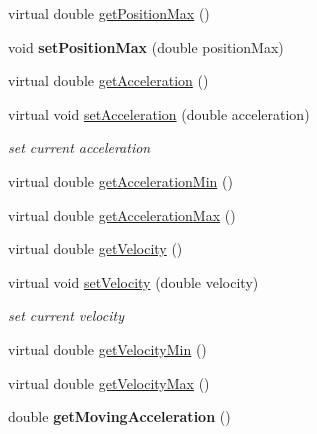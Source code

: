 \begin{DoxyCompactItemize}
\item 
virtual double \hyperlink{classdrobot_1_1device_1_1actuator_1_1PhidgetAdvancedServo_a12335ab5360aa850bbc0a3b52028d62a}{get\-Position\-Max} ()
\item 
\hypertarget{classdrobot_1_1device_1_1actuator_1_1PhidgetAdvancedServo_a4243dcae6051395e043216cad46b2f4d}{void {\bfseries set\-Position\-Max} (double position\-Max)}\label{classdrobot_1_1device_1_1actuator_1_1PhidgetAdvancedServo_a4243dcae6051395e043216cad46b2f4d}

\item 
virtual double \hyperlink{classdrobot_1_1device_1_1actuator_1_1PhidgetAdvancedServo_ae7fa5d92717bd981d753ef03b9c32da9}{get\-Acceleration} ()
\item 
virtual void \hyperlink{classdrobot_1_1device_1_1actuator_1_1PhidgetAdvancedServo_a7c1d34496318852e20f81b145584c852}{set\-Acceleration} (double acceleration)
\begin{DoxyCompactList}\small\item\em set current acceleration \end{DoxyCompactList}\item 
virtual double \hyperlink{classdrobot_1_1device_1_1actuator_1_1PhidgetAdvancedServo_a5ff12831380c5ed0cd0ed131d0725f2b}{get\-Acceleration\-Min} ()
\item 
virtual double \hyperlink{classdrobot_1_1device_1_1actuator_1_1PhidgetAdvancedServo_a91960e941fe0813b402dbb214f41be2e}{get\-Acceleration\-Max} ()
\item 
virtual double \hyperlink{classdrobot_1_1device_1_1actuator_1_1PhidgetAdvancedServo_ade608d8b4b469ae3203fcf968f3b1455}{get\-Velocity} ()
\item 
virtual void \hyperlink{classdrobot_1_1device_1_1actuator_1_1PhidgetAdvancedServo_ae960026b28343c37bf163bd7c0f84e4b}{set\-Velocity} (double velocity)
\begin{DoxyCompactList}\small\item\em set current velocity \end{DoxyCompactList}\item 
virtual double \hyperlink{classdrobot_1_1device_1_1actuator_1_1PhidgetAdvancedServo_a77b7e687934b58aec83d19c62071bf69}{get\-Velocity\-Min} ()
\item 
virtual double \hyperlink{classdrobot_1_1device_1_1actuator_1_1PhidgetAdvancedServo_a9a0090b6dcdb7dd022687665f4ca9dd9}{get\-Velocity\-Max} ()
\item 
\hypertarget{classdrobot_1_1device_1_1actuator_1_1PhidgetAdvancedServo_a517f67d4607950f36b67f31ff2c8f9ab}{double {\bfseries get\-Moving\-Acceleration} ()}\label{classdrobot_1_1device_1_1actuator_1_1PhidgetAdvancedServo_a517f67d4607950f36b67f31ff2c8f9ab}


\end{DoxyCompactItemize}
